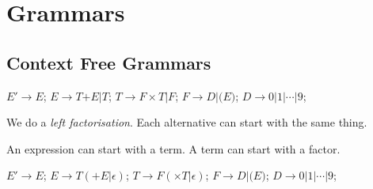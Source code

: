 
\chapter{Grammars}

\section{Context Free Grammars}

\begin{example}
$E' \rightarrow E$;
$E \rightarrow T \text{+} E | T$;
$T \rightarrow F \times T | F$;
$F \rightarrow D | \text{(} E \text{)}$;
$D \rightarrow \text{0} | \text{1} | \dotsm | \text{9}$;
\end{example}

We do a \textit{left factorisation}. 
Each alternative can start with the same thing. 

An expression can start with a term.
A term can start with a factor.


$E' \rightarrow E$;
$E \rightarrow T (\text{+} E | \epsilon)$;
$T \rightarrow F (\times T | \epsilon)$;
$F \rightarrow D | \text{(} E \text{)}$;
$D \rightarrow \text{0} | \text{1} | \dotsm | \text{9}$;

